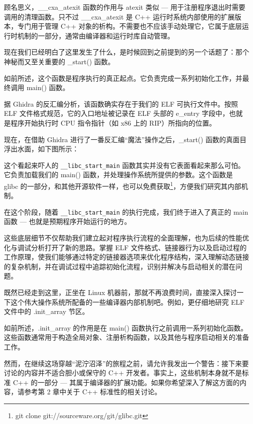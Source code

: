 顾名思义，\_\_cxa\_atexit 函数的作用与 atexit 类似 --- 用于注册程序退出时需要调用的清理函数。只不过 \_\_cxa\_atexit 是 C++ 运行时系统内部使用的扩展版本，专门用于管理 C++ 对象的析构。不需要也不应该手动处理它，它属于底层运行时机制的一部分，通常由编译器和运行时库自动管理。

现在我们已经明白了这里发生了什么，是时候回到之前提到的另一个话题了：那个神秘而又至关重要的 \_start() 函数。

如前所述，这个函数是程序执行的真正起点。它负责完成一系列初始化工作，并最终调用 main() 函数。

据 Ghidra 的反汇编分析，该函数确实存在于我们的 ELF 可执行文件中。按照 ELF 文件格式规范，它的入口地址被记录在 ELF 头部的 e\_entry 字段中，也就是程序开始执行时 CPU 指令指针（如 x86 上的 RIP）所指向的位置。


现在，在借助 Ghidra 进行了一番反汇编“魔法”操作之后，\_start() 函数的真面目浮出水面，如下图所示：


这个看起来吓人的 \verb|__libc_start_main| 函数其实并没有它表面看起来那么可怕。它负责加载我们的 main() 函数，并处理操作系统所提供的参数。这个函数是 glibc 的一部分，和其他开源软件一样，也可以免费获取\footnote{git clone git://sourceware.org/git/glibc.git}，方便我们研究其内部机制。

在这个阶段，随着 \verb|__libc_start_main| 的执行完成，我们终于进入了真正的 main 函数 --- 也就是预期程序开始运行的地方。

这些底层细节不仅帮助我们建立起对程序执行流程的全面理解，也为后续的性能优化与调试分析打开了新的思路。掌握 ELF 文件格式、链接器行为以及启动过程的工作原理，使我们能够通过特定的链接器选项来优化程序结构，深入理解动态链接的复杂机制，并在调试过程中追踪初始化流程，识别并解决与启动相关的潜在问题。


既然已经走到这里，正坐在 Linux 机器前，那就不再浪费时间，直接深入探讨一下这个伟大操作系统所配备的一些编译器内部机制吧。例如，更仔细地研究 ELF 文件中的 .init\_array 节区。

如前所述，.init\_array 的作用是在 main() 函数执行之前调用一系列初始化函数。这些函数通常用于构造全局对象、注册析构函数，以及其他与程序启动相关的准备工作。

然而，在继续这场穿越“泥泞沼泽”的旅程之前，请允许我发出一个警告：接下来要讨论的内容并不适合胆小或保守的 C++ 开发者。事实上，这些机制本身就不是标准 C++ 的一部分 --- 其属于编译器的扩展功能。如果你希望深入了解这方面的内容，请参考第 2 章中关于 C++ 标准性的相关讨论。

